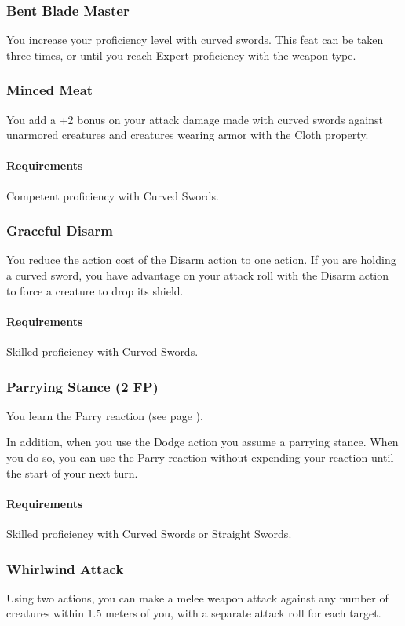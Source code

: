 \subsubsection{Bent Blade Master} \label{feat::bentblademaster}
    You increase your proficiency level with curved swords.
    This feat can be taken three times, or until you reach Expert proficiency with the weapon type.
\subsubsection{Minced Meat} \label{feat::mincedmeat}
    You add a +2 bonus on your attack damage made with curved swords against unarmored creatures and creatures wearing armor with the Cloth property.
    \paragraph{Requirements} Competent proficiency with Curved Swords.
\subsubsection{Graceful Disarm} \label{feat::gracefuldisarm}
    You reduce the action cost of the Disarm action to one action.
    If you are holding a curved sword, you have advantage on your attack roll with the Disarm action to force a creature to drop its shield.
    \paragraph{Requirements} Skilled proficiency with Curved Swords.
\subsubsection{Parrying Stance (2 FP)} \label{feat::parryingstance}
    You learn the Parry reaction (see page \pageref{act::parry}).

    In addition, when you use the Dodge action you assume a parrying stance.
    When you do so, you can use the Parry reaction without expending your reaction until the start of your next turn.
    \paragraph{Requirements} Skilled proficiency with Curved Swords or Straight Swords.
\subsubsection{Whirlwind Attack} \label{feat::whirlwindattack}
    Using two actions, you can make a melee weapon attack against any number of creatures within 1.5 meters of you, with a separate attack roll for each target.

